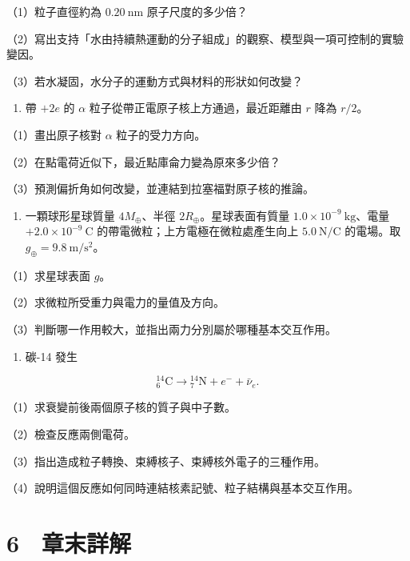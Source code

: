 \documentclass[11pt,a4paper]{article}
\providecommand{\tightlist}{%
  \setlength{\itemsep}{0pt}\setlength{\parskip}{0pt}}
\begin{document}
（1）粒子直徑約為 \(0.20\ \mathrm{nm}\) 原子尺度的多少倍？

（2）寫出支持「水由持續熱運動的分子組成」的觀察、模型與一項可控制的實驗變因。

（3）若水凝固，水分子的運動方式與材料的形狀如何改變？

\begin{enumerate}
\def\labelenumi{\arabic{enumi}.}
\setcounter{enumi}{13}
\tightlist
\item
  帶 \(+2e\) 的 \(\alpha\) 粒子從帶正電原子核上方通過，最近距離由 \(r\) 降為 \(r/2\)。
\end{enumerate}

（1）畫出原子核對 \(\alpha\) 粒子的受力方向。

（2）在點電荷近似下，最近點庫侖力變為原來多少倍？

（3）預測偏折角如何改變，並連結到拉塞福對原子核的推論。

\begin{enumerate}
\def\labelenumi{\arabic{enumi}.}
\setcounter{enumi}{14}
\tightlist
\item
  一顆球形星球質量 \(4M_\oplus\)、半徑 \(2R_\oplus\)。星球表面有質量 \(1.0\times10^{-9}\ \mathrm{kg}\)、電量 \(+2.0\times10^{-9}\ \mathrm C\) 的帶電微粒；上方電極在微粒處產生向上 \(5.0\ \mathrm{N/C}\) 的電場。取 \(g_\oplus=9.8\ \mathrm{m/s^2}\)。
\end{enumerate}

（1）求星球表面 \(g\)。

（2）求微粒所受重力與電力的量值及方向。

（3）判斷哪一作用較大，並指出兩力分別屬於哪種基本交互作用。

\begin{enumerate}
\def\labelenumi{\arabic{enumi}.}
\setcounter{enumi}{15}
\tightlist
\item
  碳-14 發生
\end{enumerate}

\[
{}^{14}_{6}\mathrm C\rightarrow{}^{14}_{7}\mathrm N+e^-+\bar\nu_e.
\]

（1）求衰變前後兩個原子核的質子與中子數。

（2）檢查反應兩側電荷。

（3）指出造成粒子轉換、束縛核子、束縛核外電子的三種作用。

（4）說明這個反應如何同時連結核素記號、粒子結構與基本交互作用。

\clearpage

\section{6　章末詳解}\label{ux7ae0ux672bux8a73ux89e3}
\end{document}
